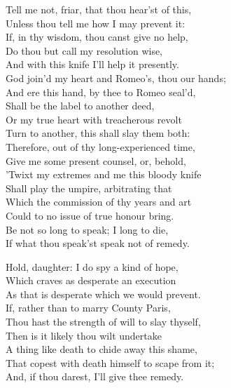 \begin{speech}
Tell me not, friar, that thou hear'st of this, \\

Unless thou tell me how I may prevent it: \\
If, in thy wisdom, thou canst give no help, \\
Do thou but call my resolution wise, \\
And with this knife I'll help it presently. \\
God join'd my heart and Romeo's, thou our hands; \\
And ere this hand, by thee to Romeo seal'd, \\
Shall be the label to another deed, \\
Or my true heart with treacherous revolt \\
Turn to another, this shall slay them both: \\
Therefore, out of thy long-experienced time, \\
Give me some present counsel, or, behold, \\
'Twixt my extremes and me this bloody knife \\
Shall play the umpire, arbitrating that \\
Which the commission of thy years and art \\
Could to no issue of true honour bring. \\
Be not so long to speak; I long to die, \\
If what thou speak'st speak not of remedy. \\
\end{speech}
\begin{speech}
Hold, daughter: I do spy a kind of hope, \\
Which craves as desperate an execution \\
As that is desperate which we would prevent. \\
If, rather than to marry County Paris, \\
Thou hast the strength of will to slay thyself, \\
Then is it likely thou wilt undertake \\
A thing like death to chide away this shame, \\
That copest with death himself to scape from it; \\
And, if thou darest, I'll give thee remedy. \\
\end{speech}

